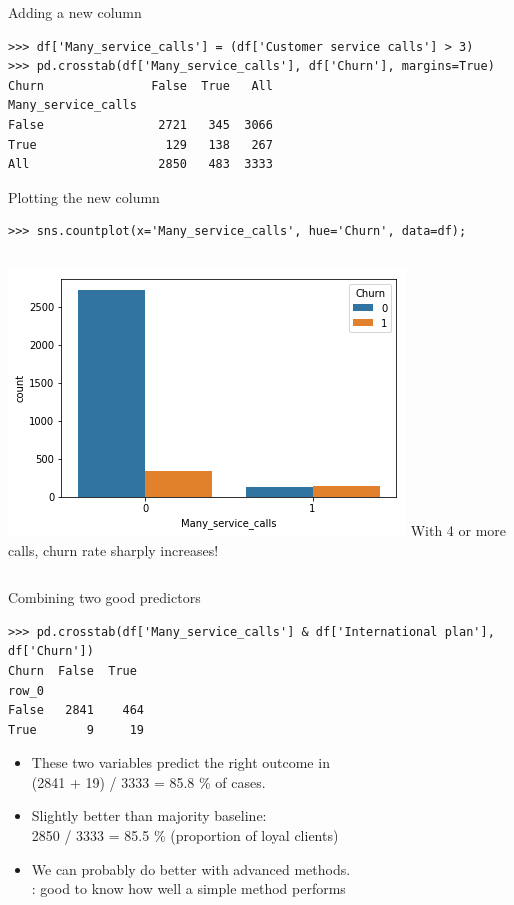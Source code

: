 \documentclass[aspectratio=169,usenames,dvipsnames]{beamer}
\begin{document}
\begin{frame}[fragile]{Adding a new column}
\begin{lstlisting}
>>> df['Many_service_calls'] = (df['Customer service calls'] > 3)
>>> pd.crosstab(df['Many_service_calls'], df['Churn'], margins=True)
Churn               False  True   All
Many_service_calls
False                2721   345  3066
True                  129   138   267
All                  2850   483  3333
\end{lstlisting}
\end{frame}

\begin{frame}[fragile]{Plotting the new column}
\begin{lstlisting}
>>> sns.countplot(x='Many_service_calls', hue='Churn', data=df);
\end{lstlisting}

\begin{columns}
\includegraphics[height=0.6\textheight]{fig/telecomplot3}
With 4 or more calls, churn rate sharply increases!
\end{columns}
\end{frame}

\begin{frame}[fragile]{Combining two good predictors}
\begin{lstlisting}
>>> pd.crosstab(df['Many_service_calls'] & df['International plan'], df['Churn'])
Churn  False  True
row_0
False   2841    464
True       9     19
\end{lstlisting}
\begin{itemize}
\item These two variables predict the right outcome in \\
    (2841 + 19) / 3333 = 85.8 \% of cases.
\item Slightly better than majority baseline: \\
    2850 / 3333 = 85.5 \%
    (proportion of loyal clients)
\item We can probably do better with advanced methods. \\
    : good to know how well a simple method performs
\end{itemize}
\end{frame}
\end{document}
